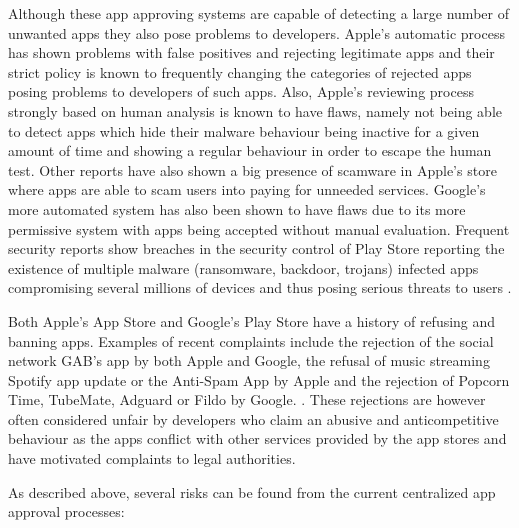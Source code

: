Although these app approving systems are capable of detecting a large number of unwanted apps they also pose problems to developers. Apple's automatic process has shown problems with false positives and rejecting legitimate apps \cite{AppleInsiderWebsite} and their strict policy is known to frequently changing the categories of rejected apps posing problems to developers of such apps. Also, Apple's reviewing process strongly based on human analysis is known to have flaws, namely not being able to detect apps which hide their malware behaviour being inactive for a given amount of time and showing a regular behaviour in order to escape the human test\cite{AppleFlaws1}. Other reports \cite{AppleFlaws2} have also shown a big presence of scamware in Apple's store where apps are able to scam users into paying for unneeded services. Google's more automated system has also been shown to have flaws \cite{AppleApprovalFortune} due to its more permissive system with apps being accepted without manual evaluation. Frequent security reports show breaches in the security control of Play Store reporting the existence of multiple malware (ransomware, backdoor, trojans) infected apps compromising several millions of devices and thus posing serious threats to users \cite{GoogleMalware1}\cite{GoogleMalware2}\cite{GoogleMalware3}.

\medskip

Both Apple's App Store and Google's Play Store have a history of refusing and banning apps. Examples of recent complaints include the rejection of the social network GAB's app by both Apple and Google\cite{AppRefusedGAB}, the refusal of music streaming Spotify app update\cite{AppleRefuseSpotify} or the Anti-Spam App\cite{AppleRefuseTRIAD} by Apple and the rejection of Popcorn Time, TubeMate, Adguard or Fildo by Google. \cite{GoogleBannedApps}. These rejections are however often considered unfair by developers who claim an abusive and anticompetitive behaviour as the apps conflict with other services provided by the app stores and have motivated complaints to legal authorities\cite{AntiCompetitiveClaim}.

\medskip

As described above, several risks can be found from the current centralized app approval processes:

